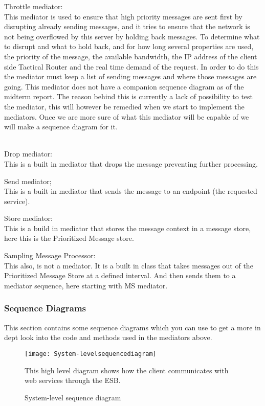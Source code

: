     Throttle mediator:\\
    This mediator is used to ensure that high priority messages are sent first by disrupting already sending messages, and it tries to ensure that the network is not being overflowed by this server by holding back messages. To determine what to disrupt and what to hold back, and for how long several properties are used, the priority of the message, the available bandwidth, the IP address of the client side Tactical Router and the real time demand of the request. In order to do this the mediator must keep a list of sending messages and where those messages are going. This mediator does not have a companion sequence diagram as of the midterm report. The reason behind this is currently a lack of possibility to test the mediator, this will however be remedied when we start to implement the mediators. Once we are more sure of what this mediator will be capable of we will make a sequence diagram for it.

    \label{Built in Mediators}
    \\
    Drop mediator:\\
    This is a built in mediator that drops the message preventing further processing.

    Send mediator;\\
    This is a built in mediator that sends the message to an endpoint (the requested service).

    Store mediator:\\
    This is a build in mediator that stores the message context in a message store, here this is the Prioritized Message store.

    Sampling Message Processor:\\
    This also, is not a mediator. It is a built in class that takes messages out of the Prioritized Message Store at a defined interval. And then sends them to a mediator sequence, here starting with MS mediator.

    \subsubsection{Sequence Diagrams}\label{Server Sequence Diagrams}
    This section contains some sequence diagrams which you can use to get a more in dept look into the code and methods used in the mediators above.
    
        \begin{figure}[H]
            \centering
            \texttt{[image: System-levelsequencediagram]}
            \caption{System-level sequence diagram}
            This high level diagram shows how the client communicates with web services through the ESB.
            \label{fig:System-levelsequencediagram}
        \end{figure}
        
